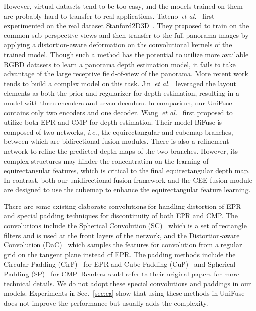 \documentclass[letterpaper, 10 pt, conference]{ieeeconf}
\def\ie{\emph{i.e.}}
\def\etal{\emph{et al.}}
\begin{document}
However, virtual datasets tend to be too easy, and the models trained on them are probably hard to transfer to real applications. 
Tateno~\etal~\cite{tateno2018distortion} first experimented on the real dataset Stanford2D3D~\cite{armeni2017joint}. They proposed to train on the common sub perspective views and then transfer to the full panorama images by applying a distortion-aware deformation on the convolutional kernels of the trained model. Though such a method has the potential to utilize more available RGBD datasets to learn a panorama depth estimation model, it fails to take advantage of the large receptive field-of-view of the panorama. More recent work~\cite{jin2020geometric, wang2020bifuse} tends to build a complex model on this task. Jin~\etal~\cite{jin2020geometric} leveraged the layout elements as both the prior and regularizer for depth estimation, resulting in a model with three encoders and seven decoders. In comparison, our UniFuse contains only two encoders and one decoder. Wang~\etal~\cite{wang2020bifuse} first proposed to utilize both EPR and CMP for  depth estimation. Their model BiFuse is composed of two networks, \ie, the equirectangular and cubemap branches, between which are bidirectional fusion modules. There is also a refinement network to refine the predicted depth maps of the two branches. 
However, its complex structures may hinder the concentration on the learning of equirectangular features, which is critical to the final equirectangular depth map. 
In contrast, both our unidirectional fusion framework and the CEE fusion module are designed to use the cubemap to enhance the equirectangular feature learning. 

{There are some existing elaborate convolutions for handling distortion of EPR and special padding techniques for discontinuity of both EPR and CMP. 
The convolutions include the Spherical Convolution (SC)~\cite{su2017learning} which is a set of rectangle filters and is used at the front layers of the network, and the Distortion-aware Convolution (DaC)~\cite{tateno2018distortion, coors2018spherenet, fernandez2020corners} which samples the features for convolution from a regular grid on the tangent plane instead of EPR. The padding methods include the Circular Padding (CirP)~\cite{wang2018omnidirectional} for EPR and Cube Padding (CuP)~\cite{cheng2018cube} and Spherical Padding (SP)~\cite{wang2020bifuse} for CMP. Readers could refer to their original papers for more technical details. We do not adopt these special convolutions and paddings in our models. Experiments in Sec.~\ref{sec:ca} show that using these methods in UniFuse does not improve the performance but usually adds the complexity.}
\end{document}
